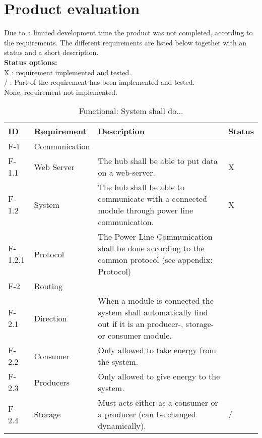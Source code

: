 \section{Product evaluation}
Due to a limited development time the product was not completed, according to the requirements. The different requirements are listed below together with an status and a short description.
\\\textbf{Status options:}
\\ X : requirement implemented and tested.
\\ / : Part of the requirement has been implemented and tested.
\\ None, requirement not implemented.
\begin{table}[H]
	\begin{tabular} [b] {| p{1.1cm} |  p{2.5cm} | p{11.0cm} | p{1.0cm} |}
	\hline
	\textbf{ID} & \textbf{Requirement} & \textbf{Description} & Status\\\hline
		F-1 & Communication 	&  ~ & ~ \\ \hline
		F-1.1 & Web Server 		& The hub shall be able to put data on a web-server. & X \\ \hline
		F-1.2 & System 		& The hub shall be able to communicate with a connected module through power line communication. & X \\ \hline
		F-1.2.1 & Protocol 		& The Power Line Communication shall be done according to the common protocol (see appendix: Protocol) & ~ \\ \hline
		F-2 & Routing 			&~&~\\ \hline
		F-2.1 & Direction		& When a module is connected the system shall automatically find out if it is an producer-, storage- or consumer module. & ~ \\ \hline
		F-2.2 & Consumer		& Only allowed to take energy from the system. & ~ \\ \hline
		F-2.3 & Producers 		& Only allowed to give energy to the system. & ~ \\ \hline
		F-2.4 & Storage 		& Must acts either as a consumer or a producer (can be changed dynamically). & / \\ \hline
	\end{tabular}
	\caption{Functional: System shall do...}
\end{table}

